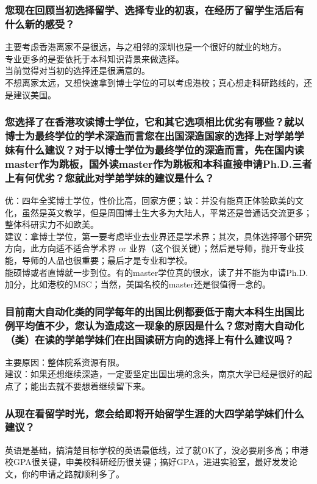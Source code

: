 \documentclass[a4paper,UTF8]{book}
\begin{document}
    \subsubsection*{您现在回顾当初选择留学、选择专业的初衷，在经历了留学生活后有什么新的感受？}
    主要考虑香港离家不是很远，与之相邻的深圳也是一个很好的就业的地方。\\
    专业更多的是要依托于本科知识背景来做选择。\\
    当前觉得对当初的选择还是很满意的。\\
    不想离家太远，又想快速拿到博士学位的可以考虑港校；真心想走科研路线的，还是建议美国。

    \subsubsection*{您选择了在香港攻读博士学位，它和其它选项相比优劣有哪些？就以博士为最终学位的学术深造而言您在出国深造国家的选择上对学弟学妹有什么建议？对于以博士学位为最终学位的深造而言，先在国内读master作为跳板，国外读master作为跳板和本科直接申请Ph.D.三者上有何优劣？您就此对学弟学妹的建议是什么？}
    优：四年全奖博士学位，性价比高，回家方便；缺：并没有能真正体验欧美的文化，虽然是英文教学，但是周围博士生大多为大陆人，平常还是普通话交流更多；整体科研实力不如欧美。\\
    建议：拿博士学位，第一要考虑毕业去业界还是学术界；其次，具体选择哪个研究方向，此方向适不适合学术界 or 业界（这个很关键）；然后是导师，抛开专业技能，导师的人品也很重要；最后才是专业和学校。\\
    能硕博或者直博就一步到位。有的master学位真的很水，读了并不能为申请Ph.D.加分，比如港校的MSC；当然，美国名校的master还是很值得一念的。

    \subsubsection*{目前南大自动化类的同学每年的出国比例都要低于南大本科生出国比例平均值不少，您认为造成这一现象的原因是什么？您对南大自动化（类）在读的学弟学妹们在出国读研方向的选择上有什么建议吗？}
    主要原因：整体院系资源有限。\\
    建议：如果还想继续深造，一定要坚定出国出境的念头，南京大学已经是很好的起点了；能出去就不要想着继续留下来。

    \subsubsection*{从现在看留学时光，您会给即将开始留学生涯的大四学弟学妹们什么建议？}
    英语是基础，搞清楚目标学校的英语最低线，过了就OK了，没必要刷多高；申港校GPA很关键，申美校科研经历很关键；搞好GPA，进进实验室，最好发发论文，你的申请之路就顺利多了。
\end{document}
